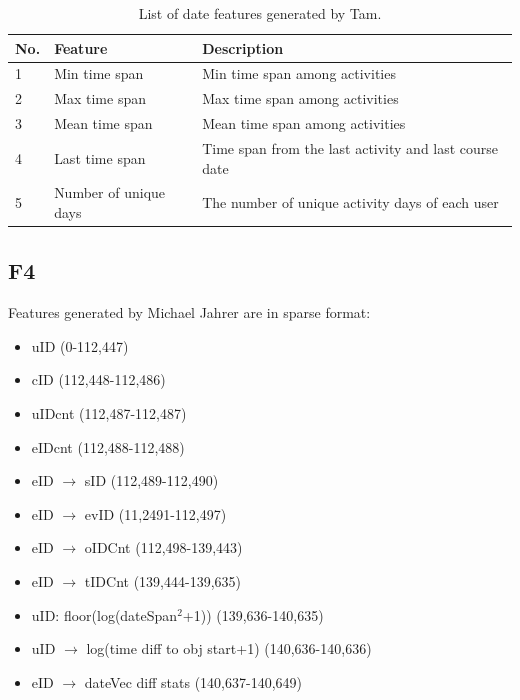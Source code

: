 \begin{center}
	\begin{table}[ht]
		\begin{minipage}{\textwidth}
			{
				\small
				\hfill{}
				\begin{tabular}{|l|l|l|}
					\hline
					\textbf{No.}&\textbf{Feature}&\textbf{Description}\tabularnewline \hline
					1 & Min time span & Min time span among activities \tabularnewline
					2 & Max time span & Max time span among activities \tabularnewline
					3 & Mean time span & Mean time span among activities \tabularnewline
					4 & Last time span & Time span from the last activity and last course date \tabularnewline
					5 & Number of unique days & The number of unique activity days of each user \tabularnewline
					\hline
				\end{tabular}
			}
			\hfill{}
			\caption{List of date features generated by Tam.}
			\label{tb:tnfeature3}
		\end{minipage}
	\end{table}
\end{center}

\subsection{F4}
Features generated by Michael Jahrer are in sparse format:

\begin{itemize}
  \setlength\itemsep{0em}
  \item uID (0-112,447)
  \item cID (112,448-112,486)
  \item uIDcnt (112,487-112,487)
  \item eIDcnt (112,488-112,488)
  \item eID $\rightarrow$ sID (112,489-112,490)
  \item eID $\rightarrow$ evID (11,2491-112,497)
  \item eID $\rightarrow$ oIDCnt (112,498-139,443)
  \item eID $\rightarrow$ tIDCnt (139,444-139,635)
  \item uID: floor(log(dateSpan$^2$+1)) (139,636-140,635)
  \item uID $\rightarrow$ log(time diff to obj start+1) (140,636-140,636)
  \item eID $\rightarrow$ dateVec diff stats (140,637-140,649)
\end{itemize}

